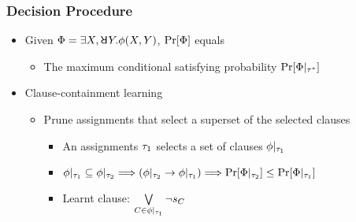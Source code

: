 \begin{frame}
    \frametitle{Decision Procedure}
    \begin{itemize}
        \item Given $\Qf=\exists X,\random{} Y.\pf(X,Y)$, $\Pr[\Phi]$ equals
              \begin{itemize}
                  \item The maximum conditional satisfying probability $\Pr[\Phi|_{\tau^*}]$
              \end{itemize}
              \pause
        \item Clause-containment learning
              \begin{itemize}
                  \item Prune assignments that select a superset of the selected clauses
                        \begin{itemize}
                            \item An assignments $\tau_1$ selects a set of clauses $\phi|_{\tau_1}$
                            \item $\phi|_{\tau_1}\subseteq\phi|_{\tau_2}\Longrightarrow(\phi|_{\tau_2}\rightarrow\phi|_{\tau_1})\Longrightarrow\Pr[\Phi|_{\tau_2}]\leq\Pr[\Phi|_{\tau_1}]$
                            \item Learnt clause: $\bigvee\limits_{C\in\phi|_{\tau_1}}\lnot s_{C}$
                        \end{itemize}
              \end{itemize}
    \end{itemize}
\end{frame}


